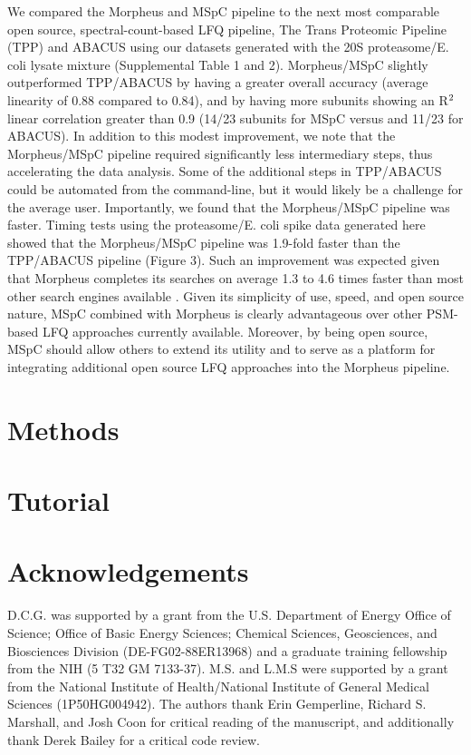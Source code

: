 We compared the Morpheus and MSpC pipeline to the next most comparable open source, spectral-count-based LFQ pipeline, The Trans Proteomic Pipeline (TPP) \citep{deutsch10} and ABACUS \citep{fermin11} using our datasets generated with the 20S proteasome/E. coli lysate mixture (Supplemental Table 1 and 2).
Morpheus/MSpC slightly outperformed TPP/ABACUS by having a greater overall accuracy (average linearity of 0.88 compared to 0.84), and by having more subunits showing an R$\textsuperscript{2}$ linear correlation greater than 0.9 (14/23 subunits for MSpC versus and 11/23 for ABACUS).
In addition to this modest improvement, we note that the Morpheus/MSpC pipeline required significantly less intermediary steps, thus accelerating the data analysis.
Some of the additional steps in TPP/ABACUS could be automated from the command-line, but it would likely be a challenge for the average user.
Importantly, we found that the Morpheus/MSpC pipeline was faster.
Timing tests using the proteasome/E. coli spike data generated here showed that the Morpheus/MSpC pipeline was 1.9-fold faster than the TPP/ABACUS pipeline (Figure 3).
Such an improvement was expected given that Morpheus completes its searches on average 1.3 to 4.6 times faster than most other search engines available \citep{wenger13}. 
Given its simplicity of use, speed, and open source nature, MSpC combined with Morpheus is clearly advantageous over other PSM-based LFQ approaches currently available.  Moreover, by being open source, MSpC should allow others to extend its utility and to serve as a platform for integrating additional open source LFQ approaches into the Morpheus pipeline. 

\section {Methods}

\section {Tutorial}

\section {Acknowledgements}
D.C.G. was supported by a grant from the U.S. Department of Energy Office of Science; Office of Basic Energy Sciences; Chemical Sciences, Geosciences, and Biosciences Division (DE-FG02-88ER13968) and a graduate training fellowship from the NIH (5 T32 GM 7133-37).  M.S. and L.M.S were supported by a grant from the National Institute of Health/National Institute of General Medical Sciences (1P50HG004942).  The authors thank Erin Gemperline, Richard S. Marshall, and Josh Coon for critical reading of the manuscript, and additionally thank Derek Bailey for a critical code review.



